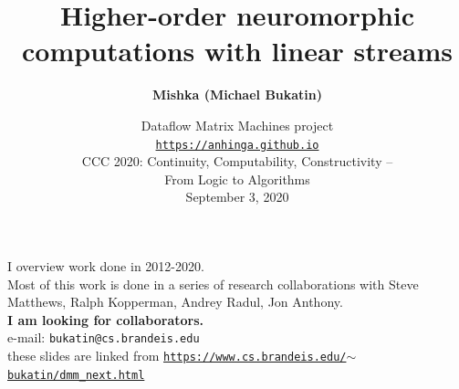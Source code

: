\documentclass{beamer}
\begin{document}
\title{Higher-order neuromorphic computations with linear streams}
\author{\bf Mishka (Michael Bukatin)}
\date[]  
{\footnotesize Dataflow Matrix Machines project\\[2ex]
\href{https://anhinga.github.io}{\tt https://anhinga.github.io}\\[6ex] 
CCC 2020: Continuity, Computability, Constructivity –\\ From Logic to Algorithms\\[2ex]
September 3, 2020
}

\begin{frame}
  \titlepage
\end{frame}

\begin{frame}

I overview work done in 2012-2020.\\[2ex]

Most of this work is done in a series of research collaborations with Steve Matthews, Ralph Kopperman, Andrey Radul, Jon Anthony.\\[2ex]

{\bf I am looking for collaborators.}\\[2ex]

e-mail: {\tt bukatin@cs.brandeis.edu}\\[2ex]

these slides are linked from \href{https://www.cs.brandeis.edu/~bukatin/dmm\_next.html}{\tt https://www.cs.brandeis.edu/$\sim$bukatin/dmm\_next.html}

\end{frame}
\end{document}
